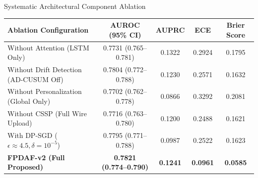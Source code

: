 \documentclass[aspectratio=169, 10pt]{beamer}
\begin{document}
\begin{frame}{Systematic Architectural Component Ablation}
    \begin{table}
        \centering
        \small
        \renewcommand{\arraystretch}{1.2}
        \begin{tabular}{lcccc}
            \toprule
            \textbf{Ablation Configuration} & \textbf{AUROC (95\% CI)} & \textbf{AUPRC} & \textbf{ECE} & \textbf{Brier Score} \\
            \midrule
            Without Attention (LSTM Only) & 0.7731 (0.765--0.781) & 0.1322 & 0.2924 & 0.1795 \\
            Without Drift Detection (AD-CUSUM Off) & 0.7804 (0.772--0.788) & 0.1230 & 0.2571 & 0.1632 \\
            Without Personalization (Global Only) & 0.7702 (0.762--0.778) & 0.0866 & 0.3292 & 0.2081 \\
            Without CSSP (Full Wire Upload) & 0.7716 (0.763--0.780) & 0.1200 & 0.2488 & 0.1621 \\
            With DP-SGD ($\epsilon \approx 4.5, \delta=10^{-5}$) & 0.7795 (0.771--0.788) & 0.0987 & 0.2522 & 0.1623 \\
            \midrule
            \textbf{FPDAF-v2 (Full Proposed)} & \textbf{0.7821 (0.774--0.790)} & \textbf{0.1241} & \textbf{0.0961} & \textbf{0.0585} \\
            \bottomrule
        \end{tabular}
    \end{table}


\end{frame}
\end{document}
